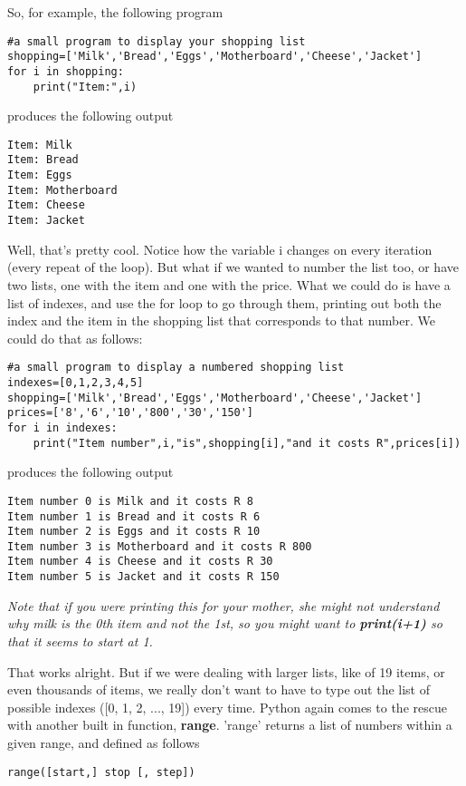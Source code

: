 So, for example, the following program
\begin{lstlisting}
#a small program to display your shopping list
shopping=['Milk','Bread','Eggs','Motherboard','Cheese','Jacket']
for i in shopping:
    print("Item:",i)
\end{lstlisting}

produces the following output
\begin{lstlisting}
Item: Milk
Item: Bread
Item: Eggs
Item: Motherboard
Item: Cheese
Item: Jacket
\end{lstlisting}

Well, that's pretty cool. Notice how the variable i changes on every iteration (every repeat of the loop). But what if we wanted to number the list too, or have two lists, one with the item and one with the price. What we could do is have a list of indexes, and use the for loop to go through them, printing out both the index and the item in the shopping list that corresponds to that number. We could do that as follows: 
\begin{lstlisting}
#a small program to display a numbered shopping list
indexes=[0,1,2,3,4,5]
shopping=['Milk','Bread','Eggs','Motherboard','Cheese','Jacket']
prices=['8','6','10','800','30','150']
for i in indexes:
    print("Item number",i,"is",shopping[i],"and it costs R",prices[i])
\end{lstlisting}   produces the following output  
\begin{lstlisting}
Item number 0 is Milk and it costs R 8
Item number 1 is Bread and it costs R 6
Item number 2 is Eggs and it costs R 10
Item number 3 is Motherboard and it costs R 800
Item number 4 is Cheese and it costs R 30
Item number 5 is Jacket and it costs R 150
\end{lstlisting}

\textit{Note that if you were printing this for your mother, she might not understand why milk is the 0th item and not the 1st, so you might want to \textbf{print(i+1)} so that it seems to start at 1.}

 That works alright. But if we were dealing with larger lists,   like of 19 items, or even thousands of items, we really don't   want to have to type out the list of possible indexes ([0, 1, 2, ...,   19]) every time. Python again comes to the rescue with another built in   function, \textbf{range}.   'range' returns a list of numbers within a given range, and defined as   follows
\begin{lstlisting}
range([start,] stop [, step])
\end{lstlisting}

